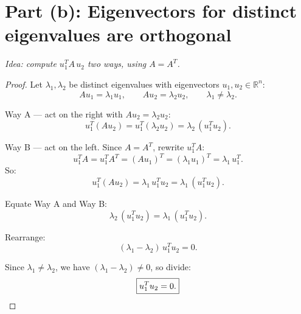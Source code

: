 \documentclass[11pt]{article}
\theoremstyle{definition}
\theoremstyle{plain}
\theoremstyle{remark}
\begin{document}
\vspace{20pt}

\section*{Part (b): Eigenvectors for distinct eigenvalues are orthogonal}

\emph{Idea: compute $u_1^T A\, u_2$ two ways, using $A = A^T$.}

\begin{proof}
Let $\lambda_1, \lambda_2$ be distinct eigenvalues with eigenvectors $u_1, u_2 \in \mathbb{R}^n$:
\[
  A u_1 = \lambda_1 u_1, \qquad A u_2 = \lambda_2 u_2, \qquad \lambda_1 \neq \lambda_2.
\]

Way A --- act on the right with $A u_2 = \lambda_2 u_2$:
\[
  u_1^T (A u_2) = u_1^T (\lambda_2 u_2) = \lambda_2 \, (u_1^T u_2).
\]

Way B --- act on the left. Since $A = A^T$, rewrite $u_1^T A$:
\[
  u_1^T A = u_1^T A^T = (A u_1)^T = (\lambda_1 u_1)^T = \lambda_1\, u_1^T.
\]
So:
\[
  u_1^T (A u_2) = \lambda_1\, u_1^T u_2 = \lambda_1 \, (u_1^T u_2).
\]

Equate Way A and Way B:
\[
  \lambda_2 \, (u_1^T u_2) = \lambda_1 \, (u_1^T u_2).
\]

Rearrange:
\[
  (\lambda_1 - \lambda_2)\, u_1^T u_2 = 0.
\]

Since $\lambda_1 \neq \lambda_2$, we have $(\lambda_1 - \lambda_2) \neq 0$, so divide:
\[
  \boxed{u_1^T u_2 = 0.} \qedhere
\]
\end{proof}
\end{document}
